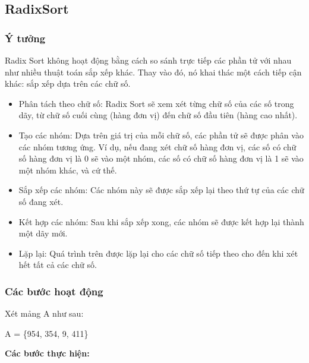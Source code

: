\subsection{RadixSort}

\subsubsection{Ý tưởng}

Radix Sort không hoạt động bằng cách so sánh trực tiếp các phần tử với nhau như nhiều thuật toán sắp xếp khác. Thay vào đó, nó khai thác một cách tiếp cận khác: sắp xếp dựa trên các chữ số.
\begin{itemize}
    \item Phân tách theo chữ số: Radix Sort sẽ xem xét từng chữ số của các số trong dãy, từ chữ số cuối cùng (hàng đơn vị) đến chữ số đầu tiên (hàng cao nhất).
    \item Tạo các nhóm: Dựa trên giá trị của mỗi chữ số, các phần tử sẽ được phân vào các nhóm tương ứng. Ví dụ, nếu đang xét chữ số hàng đơn vị, các số có chữ số hàng đơn vị là 0 sẽ vào một nhóm, các số có chữ số hàng đơn vị là 1 sẽ vào một nhóm khác, và cứ thế.
    \item Sắp xếp các nhóm: Các nhóm này sẽ được sắp xếp lại theo thứ tự của các chữ số đang xét.
    \item Kết hợp các nhóm: Sau khi sắp xếp xong, các nhóm sẽ được kết hợp lại thành một dãy mới.
    \item Lặp lại: Quá trình trên được lặp lại cho các chữ số tiếp theo cho đến khi xét hết tất cả các chữ số.
\end{itemize}
    

\subsubsection{Các bước hoạt động}
Xét mảng A như sau: 
\begin{center}
   A = \{954, 354, 9, 411\} 
\end{center} 

\textbf{Các bước thực hiện:}

